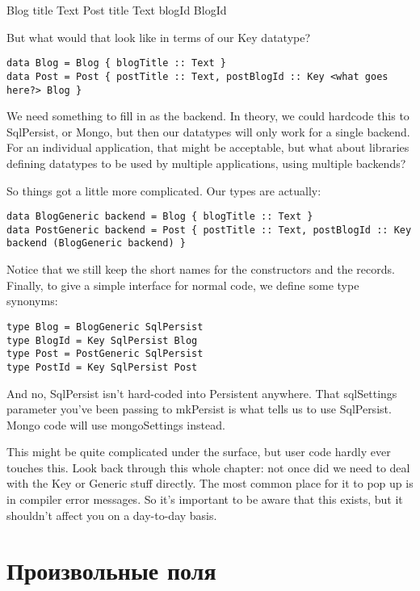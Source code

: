 Blog
    title Text
Post
    title Text
    blogId BlogId

But what would that look like in terms of our Key datatype?

\begin{lstlisting}
data Blog = Blog { blogTitle :: Text }
data Post = Post { postTitle :: Text, postBlogId :: Key <what goes here?> Blog }
\end{lstlisting}

We need something to fill in as the backend. In theory, we could hardcode this to SqlPersist, or Mongo, but then our datatypes will only work for a single backend. For an individual application, that might be acceptable, but what about libraries defining datatypes to be used by multiple applications, using multiple backends?

So things got a little more complicated. Our types are actually:

\begin{lstlisting}
data BlogGeneric backend = Blog { blogTitle :: Text }
data PostGeneric backend = Post { postTitle :: Text, postBlogId :: Key backend (BlogGeneric backend) }
\end{lstlisting}

Notice that we still keep the short names for the constructors and the records. Finally, to give a simple interface for normal code, we define some type synonyms:

\begin{lstlisting}
type Blog = BlogGeneric SqlPersist
type BlogId = Key SqlPersist Blog
type Post = PostGeneric SqlPersist
type PostId = Key SqlPersist Post
\end{lstlisting}

And no, SqlPersist isn't hard-coded into Persistent anywhere. That sqlSettings parameter you've been passing to mkPersist is what tells us to use SqlPersist. Mongo code will use mongoSettings instead.

This might be quite complicated under the surface, but user code hardly ever touches this. Look back through this whole chapter: not once did we need to deal with the Key or Generic stuff directly. The most common place for it to pop up is in compiler error messages. So it's important to be aware that this exists, but it shouldn't affect you on a day-to-day basis.

\section{Произвольные поля} %

